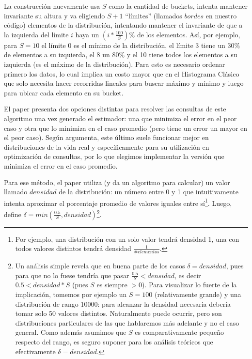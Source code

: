 La construcción nuevamente usa $S$ como la cantidad de buckets, intenta mantener invariante su altura y va eligiendo $S+1$ ``límites'' (llamados $bordes$ en nuestro código) elementos de la distribución, intentando mantener el invariante de que a la izquierda del límite $i$ haya un $(i*\frac{100}{S})\%$ de los elementos. Así, por ejemplo, para $S=10$ el límite 0 es el mínimo de la distribución, el límite $3$ tiene un $30\%$ de elementos a su izquierda, el 8 un $80\%$ y el 10 tiene todos los elementos a su izquierda (es el máximo de la distribución). Para esto es necesario ordenar primero los datos, lo cual implica un costo mayor que en el Histograma Clásico que solo necesita hacer recorridas lineales para buscar máximo y mínimo y luego para ubicar cada elemento en su bucket.

El paper presenta dos opciones distintas para resolver las consultas de este algoritmo una vez generado el estimador: una que minimiza el error en el peor caso y otra que lo minimiza en el caso promedio (pero tiene un error un mayor en el peor caso). Según argumenta, este último suele funcionar mejor en distribuciones de la vida real y específicamente para su utilización en optimización de consultas, por lo que elegimos implementar la versión que minimiza el error en el caso promedio.

Para ese método, el paper utiliza (y da un algoritmo para calcular) un valor llamado $densidad$ de la distribución: un número entre 0 y 1 que intuitivamente intenta aproximar el porcentaje promedio de valores iguales entre sí\footnote{Por ejemplo, una distribución con un solo valor tendrá densidad 1, una con todos valores distintos tendrá densidad $\frac{1}{\#elementos}$.}. Luego, define $\delta = min(\frac{0.5}{S}, densidad)$\footnote{Un análisis simple revela que en buena parte de los casos $\delta = densidad$, pues para que no lo fuese tendría que pasar $\frac{0.5}{S} < densidad$, es decir $0.5 < densidad*S$ (pues $S$ es siempre $>0$). Para visualizar lo fuerte de la implicación, tomemos por ejemplo un $S=100$ (relativamente grande) y una distribución de rango $10000$: para alcanzar la densidad necesaria debería tomar solo 50 valores distintos. Naturalmente puede ocurrir, pero son distribuciones particulares de las que hablaremos más adelante y no el caso general. Como además asumimos que $S$ es comparativamente pequeño respecto del rango, es seguro suponer para los análisis teóricos que efectivamente $\delta = densidad$.}.

